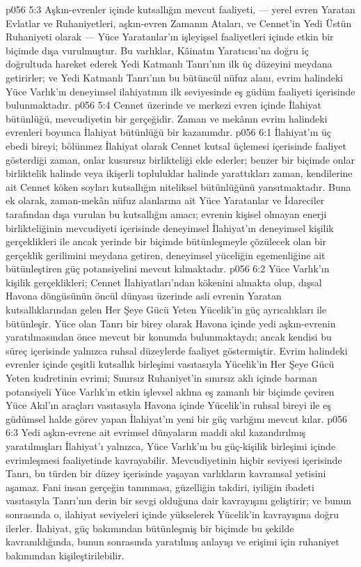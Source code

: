 \vs p056 5:3 Aşkın\hyp{}evrenler içinde kutsallığın mevcut faaliyeti, --- yerel evren Yaratan Evlatlar ve Ruhaniyetleri, aşkın\hyp{}evren Zamanın Ataları, ve Cennet’in Yedi Üstün Ruhaniyeti olarak --- Yüce Yaratanlar’ın işleyişsel faaliyetleri içinde etkin bir biçimde dışa vurulmuştur. Bu varlıklar, Kâinatın Yaratıcısı’na doğru iç doğrultuda hareket ederek Yedi Katmanlı Tanrı’nın ilk üç düzeyini meydana getirirler; ve Yedi Katmanlı Tanrı’nın bu bütüncül nüfuz alanı, evrim halindeki Yüce Varlık’ın deneyimsel ilahiyatının ilk seviyesinde eş güdüm faaliyeti içerisinde bulunmaktadır.
\vs p056 5:4 Cennet üzerinde ve merkezi evren içinde İlahiyat bütünlüğü, mevcudiyetin bir gerçeğidir. Zaman ve mekânın evrim halindeki evrenleri boyunca İlahiyat bütünlüğü bir kazanımdır.
\vs p056 6:1 İlahiyat’ın üç ebedi bireyi; bölünmez İlahiyat olarak Cennet kutsal üçlemesi içerisinde faaliyet gösterdiği zaman, onlar kusursuz birlikteliği elde ederler; benzer bir biçimde onlar birliktelik halinde veya ikişerli topluluklar halinde yarattıkları zaman, kendilerine ait Cennet köken soyları kutsallığın niteliksel bütünlüğünü yansıtmaktadır. Buna ek olarak, zaman\hyp{}mekân nüfuz alanlarına ait Yüce Yaratanlar ve İdareciler tarafından dışa vurulan bu kutsallığın amacı; evrenin kişisel olmayan enerji birlikteliğinin mevcudiyeti içerisinde deneyimsel İlahiyat’ın deneyimsel kişilik gerçeklikleri ile ancak yerinde bir biçimde bütünleşmeyle çözülecek olan bir gerçeklik gerilimini meydana getiren, deneyimsel yüceliğin egemenliğine ait bütünleştiren güç potansiyelini mevcut kılmaktadır.
\vs p056 6:2 Yüce Varlık’ın kişilik gerçeklikleri; Cennet İlahiyatları’ndan kökenini almakta olup, dışsal Havona döngüsünün öncül dünyası üzerinde asli evrenin Yaratan kutsallıklarından gelen Her Şeye Gücü Yeten Yücelik’in güç ayrıcalıkları ile bütünleşir. Yüce olan Tanrı bir birey olarak Havona içinde yedi aşkın\hyp{}evrenin yaratılmasından önce mevcut bir konumda bulunmaktaydı; ancak kendisi bu süreç içerisinde yalnızca ruhsal düzeylerde faaliyet göstermiştir. Evrim halindeki evrenler içinde çeşitli kutsallık birleşimi vasıtasıyla Yücelik’in Her Şeye Gücü Yeten kudretinin evrimi; Sınırsız Ruhaniyet’in sınırsız aklı içinde barınan potansiyeli Yüce Varlık’ın etkin işlevsel aklına eş zamanlı bir biçimde çeviren Yüce Akıl’ın araçları vasıtasıyla Havona içinde Yücelik’in ruhsal bireyi ile eş güdümsel halde görev yapan İlahiyat’ın yeni bir güç varlığını mevcut kılar.
\vs p056 6:3 Yedi aşkın\hyp{}evrene ait evrimsel dünyaların maddi akıl kazandırılmış yaratılmışları İlahiyat’ı yalnızca, Yüce Varlık’ın bu güç\hyp{}kişilik birleşimi içinde evrimleşmesi faaliyetinde kavrayabilir. Mevcudiyetinin hiçbir seviyesi içerisinde Tanrı, bu türden bir düzey içerisinde yaşayan varlıkların kavramsal yetisini aşamaz. Fani insan gerçeğin tanınması, güzelliğin takdiri, iyiliğin ibadeti vasıtasıyla Tanrı’nın derin bir sevgi olduğuna dair kavrayışını geliştirir; ve bunun sonrasında o, ilahiyat seviyeleri içinde yükselerek Yücelik’in kavrayışına doğru ilerler. İlahiyat, güç bakımından bütünleşmiş bir biçimde bu şekilde kavranıldığında, bunun sonrasında yaratılmış anlayışı ve erişimi için ruhaniyet bakımından kişileştirilebilir.
